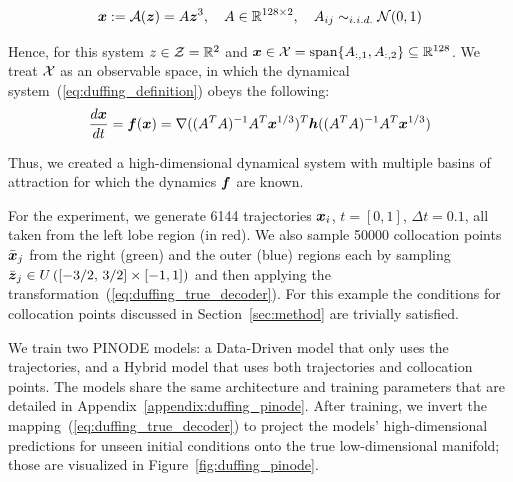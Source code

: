 \begin{equation}
    \label{eq:duffing_true_decoder}
    \boldsymbol{x} := \mathcal{A}(\boldsymbol{z}) = A\boldsymbol{z}^3, \quad A \in \mathbb{R}^{128 \times 2}, \quad A_{ij} \sim_{i.i.d.} \mathcal{N}(0, 1)
\end{equation}


Hence, for this system $z \in \operatorname{\mathcal{Z}} = \mathbb{R}^2$ and $\boldsymbol{x} \in \operatorname{\mathcal{X}} = \text{span}\{A_{:,1}, A_{:,2}\} \subseteq \mathbb{R}^{128}$. We treat $\operatorname{\mathcal{X}}$ as an observable space, in which the dynamical system~(\ref{eq:duffing_definition}) obeys the following:
\begin{equation}
    \frac{d\boldsymbol{x}}{dt} = \boldsymbol{f}(\boldsymbol{x}) = \nabla((A^TA)^{-1}A^T\boldsymbol{x}^{1/3})^T\boldsymbol{h}((A^TA)^{-1}A^T\boldsymbol{x}^{1/3})
\end{equation}

Thus, we created a high-dimensional dynamical system with multiple basins of attraction for which the dynamics $\boldsymbol{f}$ are known.

For the experiment, we generate 6144 trajectories $\boldsymbol{x}_i$, $t=[0, 1]$, $\Delta t = 0.1$, all taken from the left lobe region (in red). We also sample 50000 collocation points $\bar{\boldsymbol{x}}_j$ from the right (green) and the outer (blue) regions each by sampling $\bar{\boldsymbol{z}}_j \in U\left([-3/2,\, 3/2] \times [-1, 1]\right)$ and then applying the transformation~(\ref{eq:duffing_true_decoder}). For this example the conditions for collocation points discussed in Section~\ref{sec:method} are trivially satisfied.


We train two PINODE models: a Data-Driven model that only uses the trajectories, and a Hybrid model that uses both trajectories and collocation points. The models share the same architecture and training parameters that are detailed in Appendix~\ref{appendix:duffing_pinode}. After training, we invert the mapping~(\ref{eq:duffing_true_decoder}) to project the models' high-dimensional predictions for unseen initial conditions onto the true low-dimensional manifold; those are visualized in  Figure~\ref{fig:duffing_pinode}.  




